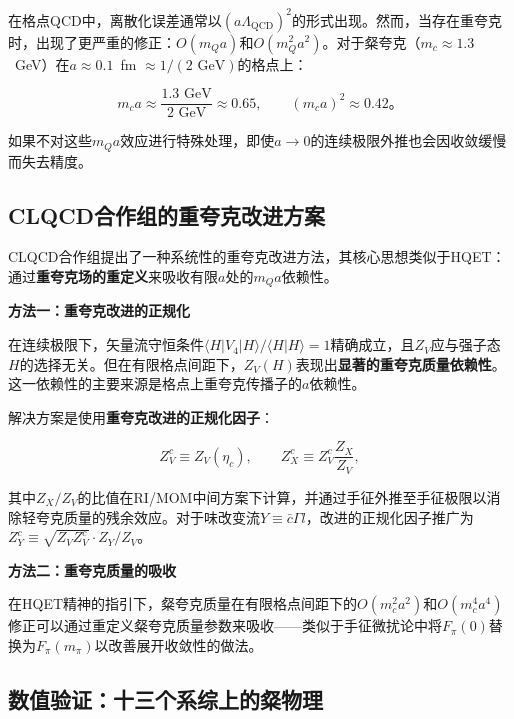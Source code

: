 \documentclass[12pt,a4paper]{ctexart}
\theoremstyle{definition}
\begin{document}
在格点QCD中，离散化误差通常以$(a\Lambda_{\text{QCD}})^2$的形式出现。然而，当存在重夸克时，出现了更严重的修正：$O(m_Q a)$和$O(m^2_Q a^2)$。对于粲夸克（$m_c \approx 1.3$~GeV）在$a \approx 0.1$~fm $\approx 1/(2\text{ GeV})$的格点上：

\begin{equation}
m_c a \approx \frac{1.3\text{ GeV}}{2\text{ GeV}} \approx 0.65, \qquad (m_c a)^2 \approx 0.42。
\end{equation}

如果不对这些$m_Q a$效应进行特殊处理，即使$a \to 0$的连续极限外推也会因收敛缓慢而失去精度\cite{CLQCD2024charm}。

\subsection{CLQCD合作组的重夸克改进方案}

CLQCD合作组\cite{CLQCD2024charm,CLQCD2025quark_mass}提出了一种系统性的重夸克改进方法，其核心思想类似于HQET：通过\textbf{重夸克场的重定义}来吸收有限$a$处的$m_Q a$依赖性。

\textbf{方法一：重夸克改进的正规化}\cite{CLQCD2024charm}

在连续极限下，矢量流守恒条件$\langle H|V_4|H\rangle / \langle H|H\rangle = 1$精确成立，且$Z_V$应与强子态$H$的选择无关。但在有限格点间距下，$Z_V(H)$表现出\textbf{显著的重夸克质量依赖性}。这一依赖性的主要来源是格点上重夸克传播子的$a$依赖性。

解决方案是使用\textbf{重夸克改进的正规化因子}：

\begin{equation}
Z^c_V \equiv Z_V(\eta_c), \qquad Z^c_X \equiv Z^c_V \frac{Z_X}{Z_V},
\label{eq:heavy_improved_Z}
\end{equation}

其中$Z_X/Z_V$的比值在RI/MOM中间方案下计算，并通过手征外推至手征极限以消除轻夸克质量的残余效应。对于味改变流$Y \equiv \bar{c}\Gamma l$，改进的正规化因子推广为$Z^c_Y \equiv \sqrt{Z_V Z^c_V} \cdot Z_Y/Z_V$。

\textbf{方法二：重夸克质量的吸收}\cite{CLQCD2024charm}

在HQET精神的指引下，粲夸克质量在有限格点间距下的$O(m^2_c a^2)$和$O(m^4_c a^4)$修正可以通过重定义粲夸克质量参数来吸收——类似于手征微扰论中将$F_\pi(0)$替换为$F_\pi(m_\pi)$以改善展开收敛性的做法。

\subsection{数值验证：十三个系综上的粲物理}
\end{document}
